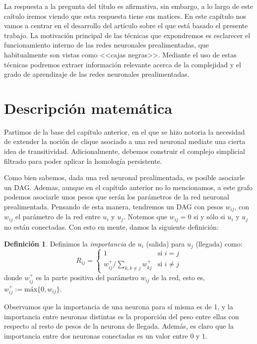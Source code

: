 \documentclass[12pt, a4paper, twoside]{book}
\numberwithin{equation}{section}
\theoremstyle{definition}
\newtheorem{defi}{Definición}[section]
\theoremstyle{remark}
\theoremstyle{plain}
\begin{document}
	La respuesta a la pregunta del título es afirmativa, sin embargo, a lo 
	largo de este caítulo iremos viendo que esta respuesta tiene sus 
	matices. En este capítulo nos vamos a centrar en el desarrollo del 
	artículo \cite{Articulo-Watanabe} sobre el que está basado el presente 
	trabajo. 
	La motivación principal de las técnicas que expondremos es esclarecer
	el funcionamiento interno de las redes neuronales prealimentadas, que 
	habitualmente son vistas como <<cajas negras>>. Mediante el uso de 
	estas técnicas podremos extraer información relevante acerca de la 
	complejidad y el grado de aprendizaje de las redes neuronales 
	prealimentadas. 

	\section{Descripción matemática}
	
	Partimos de la base del capítulo anterior, en el que se hizo notoria 
	la necesidad de extender la noción de clique asociado a una red 
	neuronal mediate una cierta idea de transitividad. Adicionalmente, 
	debemos construir el complejo simplicial filtrado para poder aplicar 
	la homología persistente.
	
	Como bien sabemos, dada una red neuronal prealimentada, es posible 
	asociarle un DAG. Ademas, aunque en el capítulo anterior no lo 
	mencionamos, a este grafo podemos asociarle unos pesos que serán los 
	parámetros de la red neuronal prealimentada. Pensando de esta manera, 
	tendremos un DAG con pesos $w_{ij}$, con $w_{ij}$ el parámetro de la 
	red entre $u_{i}$ y $u_{j}$. Notemos que $w_{ij}=0$ si y sólo si 
	$u_{i}$ y $u_{j}$ no están conectadas.
	Con esto en mente, damos la siguiente definición: 
	
	\begin{defi}
	Definimos la \textit{importancia} de $u_{i}$ (salida) para $u_{j}$ 
	(llegada) como:
	\begin{equation*}
		R_{ij}=  \left \{ 
			\begin{array}{ll}
				1 & \text{si } i=j \\
				w_{ij}^{+}/\sum_{k,k \neq j}w_{kj}^{+} & \text{si } i \neq j
			\end{array}
		\right. 
	\end{equation*}
	donde $w_{ij}^{+}$ es la parte positiva del parámetro $w_{ij}$ de la 
	red, esto es, $w_{ij}^{+}:=\text{máx}\{0,w_{ij}\}$. 
	\end{defi}
	Observamos que la importancia de una neurona para sí misma es de 1, y 
	la importancia entre neuronas distintas es la proporción del peso 
	entre ellas con respecto al resto de pesos de la neurona de llegada. 
	Además, es claro que la importancia entre dos neuronas conectadas es 
	un valor entre $0$ y $1$.
\end{document}
